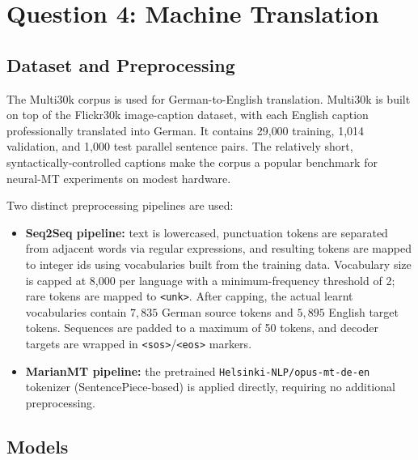 
\section{Question 4: Machine Translation}

\subsection{Dataset and Preprocessing}

The Multi30k corpus \cite{elliott2016multi30k} is used for
German-to-English translation. Multi30k is built on top of the
Flickr30k image-caption dataset, with each English caption
professionally translated into German. It contains 29{,}000 training,
1{,}014 validation, and 1{,}000 test parallel sentence pairs. The
relatively short, syntactically-controlled captions make the corpus a
popular benchmark for neural-MT experiments on modest hardware.

Two distinct preprocessing pipelines are used:

\begin{itemize}
  \item \textbf{Seq2Seq pipeline:} text is lowercased, punctuation
        tokens are separated from adjacent words via regular
        expressions, and resulting tokens are mapped to integer ids
        using vocabularies built from the training data. Vocabulary
        size is capped at 8{,}000 per language with a minimum-frequency
        threshold of 2; rare tokens are mapped to \texttt{<unk>}. After
        capping, the actual learnt vocabularies contain
        $7{,}835$ German source tokens and $5{,}895$ English target
        tokens. Sequences are padded to a maximum of 50 tokens, and
        decoder targets are wrapped in \texttt{<sos>}/\texttt{<eos>}
        markers.
  \item \textbf{MarianMT pipeline:} the pretrained
        \texttt{Helsinki-NLP/opus-mt-de-en} tokenizer
        (SentencePiece-based) is applied directly, requiring no
        additional preprocessing.
\end{itemize}

\subsection{Models}

